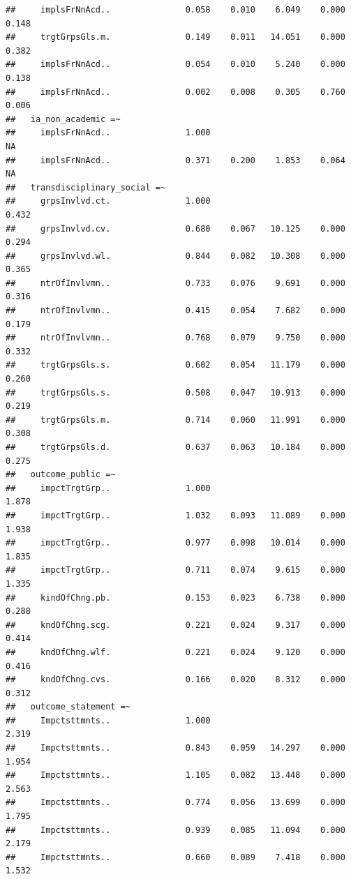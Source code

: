 \documentclass[
]{article}
\begin{document}
\begin{verbatim}
##     implsFrNnAcd..               0.058    0.010    6.049    0.000    0.148
##     trgtGrpsGls.m.               0.149    0.011   14.051    0.000    0.382
##     implsFrNnAcd..               0.054    0.010    5.240    0.000    0.138
##     implsFrNnAcd..               0.002    0.008    0.305    0.760    0.006
##   ia_non_academic =~                                                      
##     implsFrNnAcd..               1.000                                  NA
##     implsFrNnAcd..               0.371    0.200    1.853    0.064       NA
##   transdisciplinary_social =~                                             
##     grpsInvlvd.ct.               1.000                               0.432
##     grpsInvlvd.cv.               0.680    0.067   10.125    0.000    0.294
##     grpsInvlvd.wl.               0.844    0.082   10.308    0.000    0.365
##     ntrOfInvlvmn..               0.733    0.076    9.691    0.000    0.316
##     ntrOfInvlvmn..               0.415    0.054    7.682    0.000    0.179
##     ntrOfInvlvmn..               0.768    0.079    9.750    0.000    0.332
##     trgtGrpsGls.s.               0.602    0.054   11.179    0.000    0.260
##     trgtGrpsGls.s.               0.508    0.047   10.913    0.000    0.219
##     trgtGrpsGls.m.               0.714    0.060   11.991    0.000    0.308
##     trgtGrpsGls.d.               0.637    0.063   10.184    0.000    0.275
##   outcome_public =~                                                       
##     impctTrgtGrp..               1.000                               1.878
##     impctTrgtGrp..               1.032    0.093   11.089    0.000    1.938
##     impctTrgtGrp..               0.977    0.098   10.014    0.000    1.835
##     impctTrgtGrp..               0.711    0.074    9.615    0.000    1.335
##     kindOfChng.pb.               0.153    0.023    6.738    0.000    0.288
##     kndOfChng.scg.               0.221    0.024    9.317    0.000    0.414
##     kndOfChng.wlf.               0.221    0.024    9.120    0.000    0.416
##     kndOfChng.cvs.               0.166    0.020    8.312    0.000    0.312
##   outcome_statement =~                                                    
##     Impctsttmnts..               1.000                               2.319
##     Impctsttmnts..               0.843    0.059   14.297    0.000    1.954
##     Impctsttmnts..               1.105    0.082   13.448    0.000    2.563
##     Impctsttmnts..               0.774    0.056   13.699    0.000    1.795
##     Impctsttmnts..               0.939    0.085   11.094    0.000    2.179
##     Impctsttmnts..               0.660    0.089    7.418    0.000    1.532

\end{verbatim}
\end{document}
